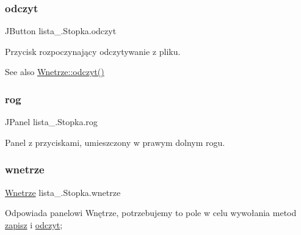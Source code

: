 \subsubsection{\texorpdfstring{odczyt}{odczyt}}
{\footnotesize\ttfamily J\+Button lista\+\_.\+Stopka.\+odczyt\hspace{0.3cm}{\ttfamily [private]}}

Przycisk rozpoczynający odczytywanie z pliku. \begin{DoxySeeAlso}{See also}
\mbox{\hyperlink{classlista__5_1_1_wnetrze_ad5ebd5c04f2c4b9de6954303c96a5856}{Wnetrze\+::odczyt()}} 
\end{DoxySeeAlso}
\mbox{\label{classlista__5_1_1_stopka_a5a1436f164fa7f3e65c148fb8716319f}} 
\subsubsection{\texorpdfstring{rog}{rog}}
{\footnotesize\ttfamily J\+Panel lista\+\_.\+Stopka.\+rog\hspace{0.3cm}{\ttfamily [private]}}

Panel z przyciskami, umieszczony w prawym dolnym rogu. \mbox{\label{classlista__5_1_1_stopka_a047d15d43be6d71f8a27a3fa4528b272}} 
\subsubsection{\texorpdfstring{wnetrze}{wnetrze}}
{\footnotesize\ttfamily \mbox{\hyperlink{classlista__5_1_1_wnetrze}{Wnetrze}} lista\+\_.\+Stopka.\+wnetrze\hspace{0.3cm}{\ttfamily [private]}}

Odpowiada panelowi Wnętrze, potrzebujemy to pole w celu wywołania metod \mbox{\hyperlink{classlista__5_1_1_stopka_a0086583a29887591d27fcfef4438b199}{zapisz}} i \mbox{\hyperlink{classlista__5_1_1_stopka_a658e033afcd318e8f01051b5ff0caa0b}{odczyt}}; \mbox{\label{classlista__5_1_1_stopka_a0086583a29887591d27fcfef4438b199}} 
